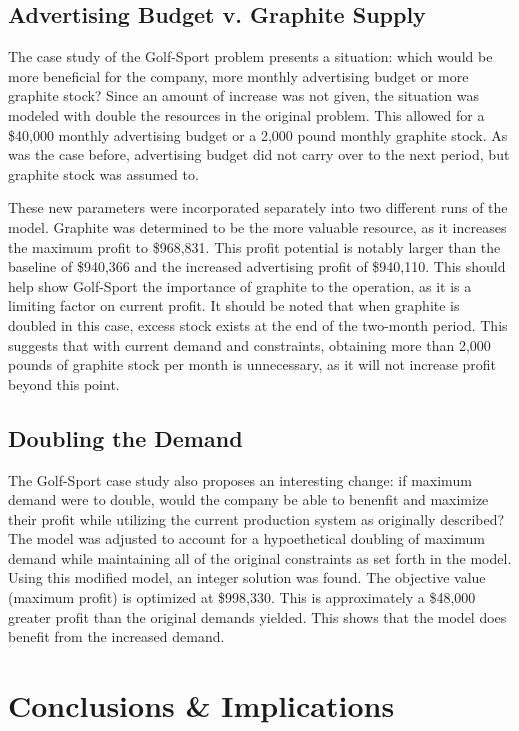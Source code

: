\documentclass{article}
\begin{document}
\subsection{Advertising Budget v. Graphite Supply}
The case study of the Golf-Sport problem presents a situation:  which would be more beneficial for the company, more monthly advertising budget or more graphite stock?  Since an amount of increase was not given, the situation was modeled with double the resources in the original problem.  
This allowed for a \$40,000 monthly advertising budget or a 2,000 pound monthly graphite stock.  As was the case before, advertising budget did not carry over to the next period, but graphite stock was assumed to.
\par
These new parameters were incorporated separately into two different runs of the model.  Graphite was determined to be the more valuable resource, as it increases the maximum profit to \$968,831.  This profit potential is notably larger than the baseline of \$940,366 and the increased advertising 
profit of \$940,110.  This should help show Golf-Sport the importance of graphite to the operation, as it is a limiting factor on current profit.  It should be noted that when graphite is doubled in this case, excess stock exists at the end of the two-month period.  This suggests that with current demand and constraints, obtaining more than 2,000 pounds of graphite stock per month is unnecessary, 
as it will not increase profit beyond this point.
\subsection{Doubling the Demand}
The Golf-Sport case study also proposes an interesting change:  if maximum demand were to double, would the company be able to benenfit and maximize their profit while utilizing the current production system as originally described?  The model was adjusted to account for a hypoethetical doubling of maximum demand while maintaining all of the original constraints as set forth in the model.  
Using this modified model, an integer solution was found.  The objective value (maximum profit) is optimized at \$998,330.  This is approximately a \$48,000 greater profit than the original demands yielded.  This shows that the model does benefit from the increased demand.

\section{Conclusions \& Implications}
\end{document}

